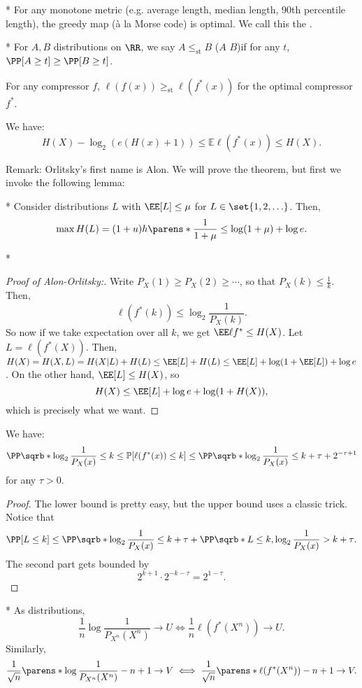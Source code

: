 \begin{fact}*
	For any monotone metric (e.g. average length, median length, 90th percentile length), the greedy map (\`a la Morse code) is optimal.
	We call this the .
\end{fact}

\begin{defn}*
	For $A,B$ distributions on $\RR$, we say $A\leq_{\text{st}} B$ ($A$  $B$)if for any $t$, $\PP[A\geq t] \geq \PP[B\geq t]$.
\end{defn}

\begin{thm}
	For any compressor $f$, $\ell(f(x)) \geq_{\text{st}} \ell(f^*(x))$ for the optimal compressor $f^*$.
\end{thm}

\begin{thm}
	We have: \[
		H(X) - \log_2(e(H(x) + 1)) \leq \mathbb E \ell(f^*(x)) \leq H(X).
	\]
\end{thm}

Remark: Orlitsky's first name is Alon. We will prove the theorem, but first we invoke the following lemma:

\begin{lem}*
	Consider distributions $L$ with $\EE[L] \leq \mu$ for $L\in \set{1,2,\ldots}$. Then, \[
		\max H(L) = (1+u) h \parens*{\frac 1{1+\mu}}\leq \log(1+\mu) + \log e.
	\]
\end{lem}*

\begin{proof}
	[Proof of Alon-Orlitsky:]
	Write $P_X(1) \geq P_X(2) \geq \cdots$, so that $P_X(k) \leq \frac 1k$. Then, \[
		\ell(f^*(k)) \leq \log_2 \frac{1}{P_X(k)}.
	\]So now if we take expectation over all $k$, we get $\EE \ell f^*\leq H(X)$.
	Let $L = \ell(f^*(X))$. Then, $H(X) = H(X,L) = H(X|L) + H(L) \leq \EE[L] + H(L)\leq \EE[L] + \log(1 + \EE[L]) + \log e$.
	On the other hand, $\EE[L]\leq H(X)$, so \[
		H(X) \leq \EE[L] + \log e + \log(1+H(X)),
	\]
	which is precisely what we want.
\end{proof}

\begin{thm}
	We have: \[
		\PP\sqrb*{\log_2 \frac{1}{P_X(x)} \leq k} \leq \mathbb P[\ell(f^*(x))\leq k] \leq \PP\sqrb*{\log_2 \frac{1}{P_X(x)} \leq k+\tau} + 2^{-\tau+1}
	\]
	for any $\tau > 0$.
\end{thm}

\begin{proof}
	The lower bound is pretty easy, but the upper bound uses a classic trick.
	Notice that \[
		\PP[L\leq k] \leq \PP\sqrb*{\log_2 \frac{1}{P_X(x)} \leq k+\tau} + \PP\sqrb*{L \leq k, \log_2 \frac{1}{P_X(x)} > k+\tau}.
	\]
	The second part gets bounded by \[
		2^{k+1}\cdot 2^{-k-\tau} = 2^{1-\tau}.
	\]
\end{proof}

\begin{cor}*
	As distributions, \[
		\frac 1n \log \frac{1}{P_{X^n}(X^n)} \to U \iff \frac 1n \ell(f^*(X^n)) \to U.
	\]
	Similarly, \[
		\frac 1{\sqrt n} \parens*{\log \frac{1}{P_{X^n}(X^n)} - n+1}\to V \iff \frac 1{\sqrt{n}} \parens*{\ell(f^*(X^n)) - n + 1}\to V.
	\]
\end{cor}
